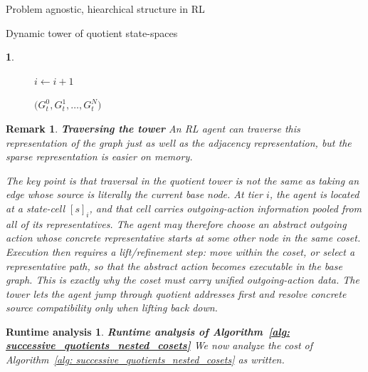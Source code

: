 \documentclass[11pt]{article}
\newtheorem{remark}[subsubsection]{Remark}
\newtheorem{ermark}[subsubsection]{}
\newtheorem{run_analysis}[subsubsection]{Runtime analysis}
\begin{document}
\begin{section}{Problem agnostic, hiearchical structure in RL}
\begin{subsection}{Dynamic tower of quotient state-spaces}
\begin{ermark}
\begin{figure}[!h]
\begin{algorithm}[H]
\begin{algorithmic}[1]
        \State $i \gets i+1$

    \EndWhile

    \State \Return $\bigl(
    G_t^0,G_t^1,\dots,G_t^N
    \bigr)$
\EndFunction

\end{algorithmic}
\end{algorithm}
    \label{fig: algorithm 1}
\end{figure}

\end{ermark}

\begin{remark}
{\bf Traversing the tower}
\normalfont
An RL agent can traverse this representation of the graph just as well as the adjacency representation, but the sparse representation is easier on memory.

The key point is that traversal in the quotient tower is not the same as taking an edge whose source is literally the current base node. At tier $i$, the agent is located at a state-cell $[s]_i$, and that cell carries outgoing-action information pooled from all of its representatives. The agent may therefore choose an abstract outgoing action whose concrete representative starts at some other node in the same coset. Execution then requires a lift/refinement step: move within the coset, or select a representative path, so that the abstract action becomes executable in the base graph. This is exactly why the coset must carry unified outgoing-action data. The tower lets the agent jump through quotient addresses first and resolve concrete source compatibility only when lifting back down.
\end{remark}

\begin{run_analysis}
{\bf Runtime analysis of Algorithm~\ref{alg: successive_quotients_nested_cosets}}
\normalfont
We now analyze the cost of Algorithm~\ref{alg: successive_quotients_nested_cosets} as written.


\end{run_analysis}
\end{subsection}
\end{section}
\end{document}
